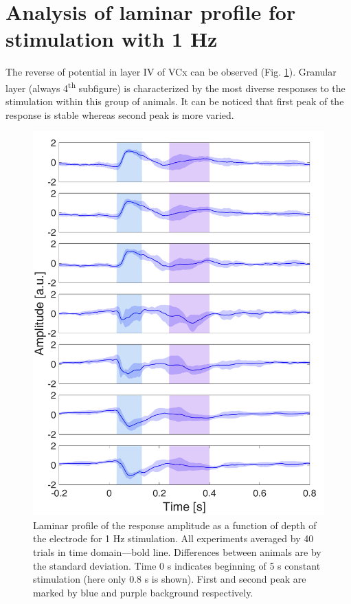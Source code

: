 \documentclass{pracalicmgr}
\begin{document}
    
    \section{Analysis of laminar profile for stimulation with 1 Hz}
        The reverse of potential in layer IV of VCx can be observed (Fig. \ref{rys:srednie_1Hz_1s}). Granular layer (always 4\textsuperscript{th} subfigure) is characterized by the most diverse responses to the stimulation within this group of animals. It can be noticed that first peak of the response is stable whereas second peak is more varied. 
    \begin{figure}[H]
    	\centering
    	\includegraphics[scale=0.4]{usrednianie_z_tlem.png}
    	\caption{Laminar profile of the response amplitude as a function of depth of the electrode for 1 Hz stimulation. All experiments averaged by 40 trials in time domain---bold line. Differences between animals are by the standard deviation. Time 0 s indicates beginning of 5 s constant stimulation (here only 0.8 s is shown). First and second peak are marked by blue and purple background respectively.}
    	\label{rys:srednie_1Hz_1s}
    \end{figure}
    
\end{document}

